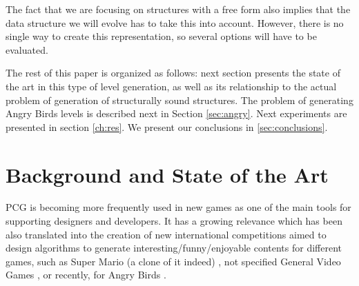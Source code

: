 \documentclass[runningheads,a4paper]{llncs}
\begin{document}
The fact that we are focusing on structures with a free form also
implies that the data structure we will evolve has to take this into
account. However, there is no single way to create this representation,
 so several options will have to be evaluated. 



 

The rest of this paper is organized as follows: next section presents
the state of the art in this type of level generation, as well as its
relationship to the actual problem of generation of structurally sound
structures. The problem of generating Angry Birds levels is described
next in Section \ref{sec:angry}. Next experiments are presented in
section \ref{ch:res}. We present our conclusions in \ref{sec:conclusions}.

\section{Background and State of the Art}
\label{sec:soa}

PCG is becoming more frequently used in new games as one of the main
tools for supporting designers and developers. It has a growing
relevance which has been also translated into the creation of new
international competitions aimed to design algorithms to generate
interesting/funny/enjoyable contents for different games, such as
Super Mario (a clone of it indeed) \cite{MarioAI_Level_12}, not
specified General Video Games
\cite{GAIG_LevelGeneration_18,Khalifa_GVGLG_16}, or recently, for
Angry Birds \cite{AngryBirds_LevelGeneration_18}. 
\end{document}
